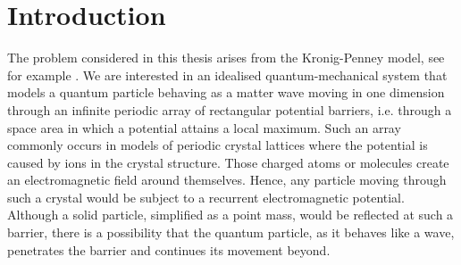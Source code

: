 \chapter{Introduction} \label{chap:1}

The problem considered in this thesis arises from the Kronig-Penney model, see for example \cite[Chapter 3]{heering2002elektrophysik}. We are interested in an idealised quantum-mechanical system that models a quantum particle behaving as a matter wave moving in one dimension through an infinite periodic array of rectangular potential barriers, i.e. through a space area in which a potential attains a local maximum. Such an array commonly occurs in models of periodic crystal lattices where the potential is caused by ions in the crystal structure. Those charged atoms or molecules create an electromagnetic field around themselves. Hence, any particle moving through such a crystal would be subject to a recurrent electromagnetic potential. Although a solid particle, simplified as a point mass, would be reflected at such a barrier, there is a possibility that the quantum particle, as it behaves like a wave, penetrates the barrier and continues its movement beyond. 
~\\

